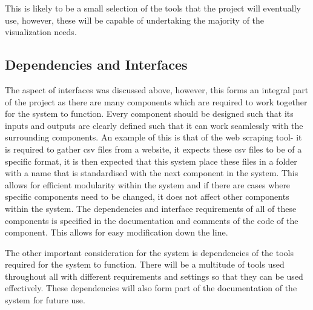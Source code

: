 \documentclass[12pt,onecolumn]{IEEEtran}
\begin{document}
This is likely to be a small selection of the tools that the project will eventually use, however, these will be capable of undertaking the majority of the visualization needs.


\subsection{Dependencies and Interfaces} \label{sec:DependenciesInterfaces}
The aspect of interfaces was discussed above, however, this forms an integral part of the project as there are many components which are required to work together for the system to function.
Every component should be designed such that its inputs and outputs are clearly defined such that it can work seamlessly with the surrounding components. 
An example of this is that of the web scraping tool- it is required to gather csv files from a website, it expects these csv files to be of a specific format, it is then expected that this system place these files in a folder with a name that is standardised with the next component in the system.
This allows for efficient modularity within the system and if there are cases where specific components need to be changed, it does not affect other components within the system.
The dependencies and interface requirements of all of these components is specified in the documentation and comments of the code of the component. This allows for easy modification down the line. 

The other important consideration for the system is dependencies of the tools required for the system to function. There will be a multitude of tools used throughout all with different requirements and settings so that they can be used effectively. These dependencies will also form part of the documentation of the system for future use.



\end{document}
